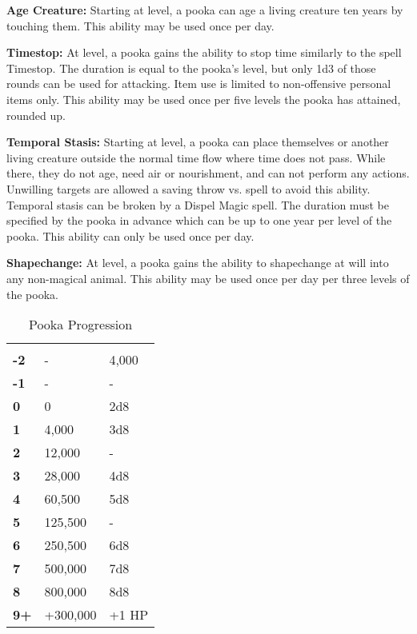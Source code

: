 \begin{multicols*}{2}
\textbf{Age Creature:} Starting at  level, a pooka can age a living creature ten years by touching them. This ability may be used once per day.

\textbf{Timestop:} At  level, a pooka gains the ability to stop time similarly to the spell Timestop. The duration is equal to the pooka's level, but only 1d3 of those rounds can be used for attacking. Item use is limited to non-offensive personal items only. This ability may be used once per five levels the pooka has attained, rounded up.

\textbf{Temporal Stasis:} Starting at  level, a pooka can place themselves or another living creature outside the normal time flow where time does not pass. While there, they do not age, need air or nourishment, and can not perform any actions. Unwilling targets are allowed a saving throw vs. spell to avoid this ability. Temporal stasis can be broken by a Dispel Magic spell. The duration must be specified by the pooka in advance which can be up to one year per level of the pooka. This ability can only be used once per day. 

\textbf{Shapechange:} At  level, a pooka gains the ability to shapechange at will into any non-magical animal. This ability may be used once per day per three levels of the pooka.


\begin {table}[H]
  \caption{Pooka Progression}
  \begin{tabularx}{\columnwidth}{>{\bfseries}YYY}
   &  & \\
	-2 & - & 4,000\\
	-1 & - & -\\
	0 & 0 & 2d8\\
	1 & 4,000 & 3d8\\
	2 & 12,000 & -\\
	3 & 28,000 & 4d8\\
	4 & 60,500 & 5d8\\
	5 & 125,500 & -\\
	6 & 250,500 & 6d8\\
	7 & 500,000 & 7d8\\
	8 & 800,000 & 8d8\\
	9+ & +300,000 & +1 HP
  \end {tabularx}
\end {table}


\end{multicols*}

